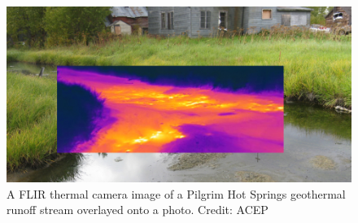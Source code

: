 \begin{figure}[hb]
	\centering
	
	\includegraphics[width=\textwidth]{figures/PilgrimFLIR.png} 

	\caption{A FLIR thermal camera image of a Pilgrim Hot Springs geothermal runoff stream overlayed onto a photo. Credit: ACEP}
	\label{fig:pilgrimFLIR}


\end{figure}